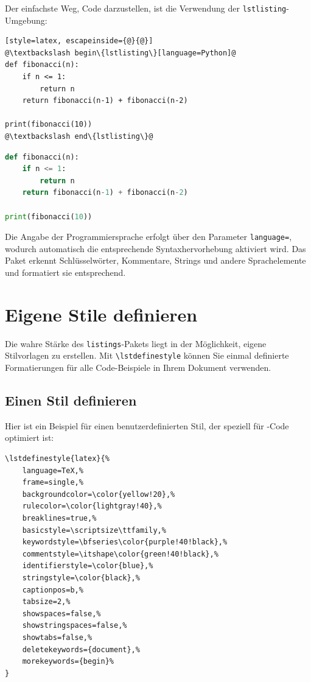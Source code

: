 Der einfachste Weg, Code darzustellen, ist die Verwendung der \texttt{lstlisting}-Umgebung:

\begin{lstlisting}[style=latex, escapeinside={@}{@}]
@\textbackslash begin\{lstlisting\}[language=Python]@
def fibonacci(n):
    if n <= 1:
        return n
    return fibonacci(n-1) + fibonacci(n-2)

print(fibonacci(10))
@\textbackslash end\{lstlisting\}@
\end{lstlisting}

\begin{ausgabe}
\begin{lstlisting}[language=Python]
def fibonacci(n):
    if n <= 1:
        return n
    return fibonacci(n-1) + fibonacci(n-2)

print(fibonacci(10))
\end{lstlisting}
\end{ausgabe}

Die Angabe der Programmiersprache erfolgt über den Parameter \texttt{language=}, wodurch automatisch die entsprechende Syntaxhervorhebung aktiviert wird. Das Paket erkennt Schlüsselwörter, Kommentare, Strings und andere Sprachelemente und formatiert sie entsprechend.



\section{Eigene Stile definieren}

Die wahre Stärke des \texttt{listings}-Pakets liegt in der Möglichkeit, eigene Stilvorlagen zu erstellen. Mit \texttt{\textbackslash lstdefinestyle} können Sie einmal definierte Formatierungen für alle Code-Beispiele in Ihrem Dokument verwenden.



\subsection{Einen Stil definieren}

Hier ist ein Beispiel für einen benutzerdefinierten Stil, der speziell für -Code optimiert ist:

\begin{lstlisting}[style=latex]
%Einstellung der Codeumgebung fuer LaTeX-Code-Beispiele
\lstdefinestyle{latex}{%
	language=TeX,%
	frame=single,%
	backgroundcolor=\color{yellow!20},%
	rulecolor=\color{lightgray!40},%
	breaklines=true,%
	basicstyle=\scriptsize\ttfamily,%
	keywordstyle=\bfseries\color{purple!40!black},%
	commentstyle=\itshape\color{green!40!black},%
	identifierstyle=\color{blue},%
	stringstyle=\color{black},%
	captionpos=b,%
	tabsize=2,%
	showspaces=false,%
	showstringspaces=false,%
	showtabs=false,%
	deletekeywords={document},%
	morekeywords={begin}%
}
\end{lstlisting}



